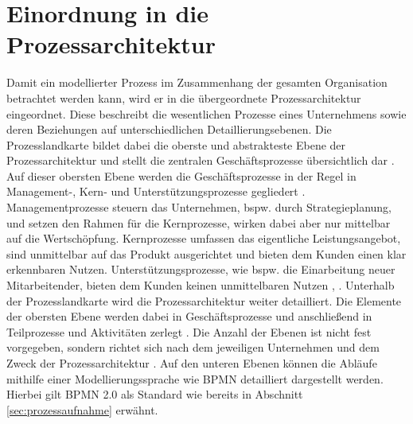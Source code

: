 \section{Einordnung in die Prozessarchitektur}
\label{sec:Prozesslandkarte}
Damit ein modellierter Prozess im Zusammenhang der gesamten Organisation betrachtet werden kann, wird er in die übergeordnete Prozessarchitektur eingeordnet. Diese beschreibt die wesentlichen Prozesse eines Unternehmens sowie deren Beziehungen auf unterschiedlichen Detaillierungsebenen. Die Prozesslandkarte bildet dabei die oberste und abstrakteste Ebene der Prozessarchitektur und stellt die zentralen Geschäftsprozesse übersichtlich dar \cite{dumas2021grundlagen}.
\newline
Auf dieser obersten Ebene werden die Geschäftsprozesse in der Regel in Management-, Kern- und Unterstützungsprozesse gegliedert \cite{ottenlips2025geschaftsprozessmanagement}. Managementprozesse steuern das Unternehmen, bspw. durch Strategieplanung, und setzen den Rahmen für die Kernprozesse, wirken dabei aber nur mittelbar auf die Wertschöpfung. Kernprozesse umfassen das eigentliche Leistungsangebot, sind unmittelbar auf das Produkt ausgerichtet und bieten dem Kunden einen klar erkennbaren Nutzen. Unterstützungsprozesse, wie bspw. die Einarbeitung neuer Mitarbeitender, bieten dem Kunden keinen unmittelbaren Nutzen \cite{ottenlips2025geschaftsprozessmanagement}, \cite{schwarz2018geschaftsprozesse}.
\newline
Unterhalb der Prozesslandkarte wird die Prozessarchitektur weiter detailliert. Die Elemente der obersten Ebene werden dabei in Geschäftsprozesse und anschließend in Teilprozesse und Aktivitäten zerlegt \cite{dumas2021grundlagen}. Die Anzahl der Ebenen ist nicht fest vorgegeben, sondern richtet sich nach dem jeweiligen Unternehmen und dem Zweck der Prozessarchitektur \cite{dumas2021grundlagen}. Auf den unteren Ebenen können die Abläufe mithilfe einer Modellierungssprache wie \acs{BPMN} detailliert dargestellt werden. Hierbei gilt \acs{BPMN} 2.0 als Standard wie bereits in Abschnitt \ref{sec:prozessaufnahme} erwähnt. 





